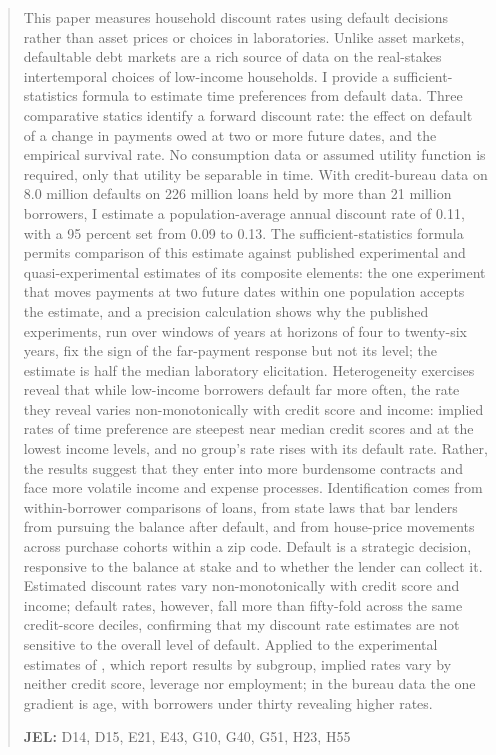 \documentclass[12pt,english]{article}
\begin{document}
\begin{abstract}
\begin{singlespace} \vspace{-0.3cm}

\noindent This paper measures household discount rates using default decisions rather than asset prices or choices in laboratories. Unlike asset markets, defaultable debt markets are a rich source of data on the real-stakes intertemporal choices of low-income households. I provide a sufficient-statistics formula to estimate time preferences from default data. Three comparative statics identify a forward discount rate: the effect on default of a change in payments owed at two or more future dates, and the empirical survival rate. No consumption data or assumed utility function is required, only that utility be separable in time. With credit-bureau data on 8.0 million defaults on 226 million loans held by more than 21 million borrowers, I estimate a population-average annual discount rate of 0.11, with a 95 percent set from 0.09 to 0.13. The sufficient-statistics formula permits comparison of this estimate against published experimental and quasi-experimental estimates of its composite elements: the one experiment that moves payments at two future dates within one population accepts the estimate, and a precision calculation shows why the published experiments, run over windows of years at horizons of four to twenty-six years, fix the sign of the far-payment response but not its level; the estimate is half the median laboratory elicitation. Heterogeneity exercises reveal that while low-income borrowers default far more often, the rate they reveal varies non-monotonically with credit score and income: implied rates of time preference are steepest near median credit scores and at the lowest income levels, and no group's rate rises with its default rate. Rather, the results suggest that they enter into more burdensome contracts and face more volatile income and expense processes. Identification comes from within-borrower comparisons of loans, from state laws that bar lenders from pursuing the balance after default, and from house-price movements across purchase cohorts within a zip code. Default is a strategic decision, responsive to the balance at stake and to whether the lender can collect it. Estimated discount rates vary non-monotonically with credit score and income; default rates, however, fall more than fifty-fold across the same credit-score deciles, confirming that my discount rate estimates are not sensitive to the overall level of default. Applied to the experimental estimates of \citet{dobbie_targeted_2020}, which report results by subgroup, implied rates vary by neither credit score, leverage nor employment; in the bureau data the one gradient is age, with borrowers under thirty revealing higher rates.

\end{singlespace}

\vspace{0.25cm}

\begin{singlespace}
\noindent \textbf{JEL:} D14, D15, E21, E43, G10, G40, G51, H23, H55

\end{singlespace}
\end{abstract}
\end{document}
